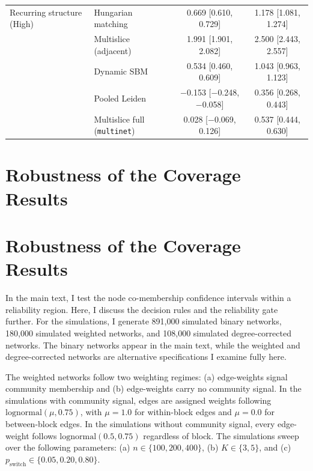 \documentclass[11pt, letterpaper]{article}
\numberwithin{equation}{section}
\begin{document}
\begin{table}[htbp]
\begin{tabular}{llcc}
Recurring structure (High) & Hungarian matching & 0.669 [0.610, 0.729] & 1.178 [1.081, 1.274] \\
 & Multislice (adjacent) & 1.991 [1.901, 2.082] & 2.500 [2.443, 2.557] \\
 & Dynamic SBM & 0.534 [0.460, 0.609] & 1.043 [0.963, 1.123] \\
 & Pooled Leiden & $-$0.153 [$-$0.248, $-$0.058] & 0.356 [0.268, 0.443] \\
 & Multislice full (\texttt{multinet}) & 0.028 [$-$0.069, 0.126] & 0.537 [0.444, 0.630] \\
\bottomrule
\end{tabular}
\end{table}

\section{Robustness of the Coverage Results}
\label{app:coverage_robust}
\section{Robustness of the Coverage Results}
\label{app:coverage_robust}
In the main text, I test the node co-membership confidence intervals within a reliability region. Here, I discuss the decision rules and the reliability gate further. For the simulations, I generate 891,000 simulated binary networks, 180,000 simulated weighted networks, and 108,000 simulated degree-corrected networks. The binary networks appear in the main text, while the weighted and degree-corrected networks are alternative specifications I examine fully here.

The weighted networks follow two weighting regimes: (a) edge-weights signal community membership and (b) edge-weights carry no community signal. In the simulations with community signal, edges are assigned weights following $\mathrm{lognormal}(\mu, 0.75)$, with $\mu = 1.0$ for within-block edges and $\mu = 0.0$ for between-block edges. In the simulations without community signal, every edge-weight follows $\mathrm{lognormal}(0.5, 0.75)$ regardless of block. The simulations sweep over the following parameters: (a) $n \in \{100, 200, 400\}$, (b) $K \in \{3, 5\}$, and (c) $p_{\mathrm{switch}} \in \{0.05, 0.20, 0.80\}$.
\end{document}
